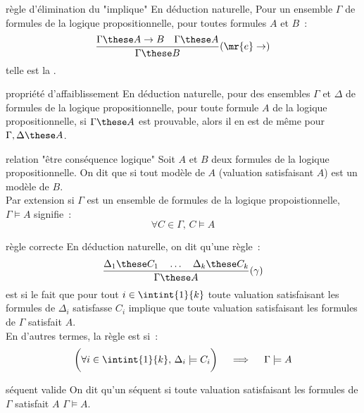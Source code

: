 \begin{adjustwidth}{-3cm}{-3cm}
\begin{definition}{7.15}{règle d'élimination du "implique"}
    En déduction naturelle, Pour un ensemble $\Gamma$ de formules de la logique propositionnelle, pour toutes formules $A$ et $B$~:
    $$\frac{\Gamma \these A \to B \quad \Gamma \these A}{\Gamma \these B}(\mr{e}\to)$$
    telle est la .
\end{definition}

\begin{theoreme}{7.16}{propriété d'affaiblissement}
    En déduction naturelle, pour des ensembles $\Gamma$ et $\Delta$ de formules de la logique propositionnelle, pour toute formule $A$ de la logique propositionnelle, si $\Gamma \these A$ est prouvable, alors il en est de même pour $\Gamma,\Delta \these A$.
\end{theoreme}

\begin{definition}{7.17}{relation "être conséquence logique"}
    Soit $A$ et $B$ deux formules de la logique propositionnelle. On dit que  si tout modèle de $A$ (valuation satisfaisant $A$) est un modèle de $B$.\\
    Par extension si $\Gamma$ est un ensemble de formules de la logique propoistionnelle, $\Gamma \models A$ signifie~:
    $$\forall C \in \Gamma,\, C \models A$$ 
\end{definition}

\begin{definition}{7.18}{règle correcte}
    En déduction naturelle, on dit qu'une règle~:
    $$\frac{\Delta_1 \these C_1 \quad \dots \quad \Delta_k \these C_k}{\Gamma \these A}(\gamma)$$
    est  si le fait que pour tout $i \in \intint{1}{k}$ toute valuation satisfaisant les formules de $\Delta_i$ satisfasse $C_i$ implique que toute valuation satisfaisant les formules de $\Gamma$ satisfait $A$.\\
    En d'autres termes, la règle est  si~:
    $$\bigg(\forall i \in \intint{1}{k},\, \Delta_i \models C_i\bigg) \quad\implies \quad \Gamma \models A$$
\end{definition}

\begin{definition}{7.19}{séquent valide}
    On dit qu'un séquent  si toute valuation satisfaisant les formules de $\Gamma$ satisfait $A$ \ie $\Gamma \models A$.
\end{definition}


\end{adjustwidth}
